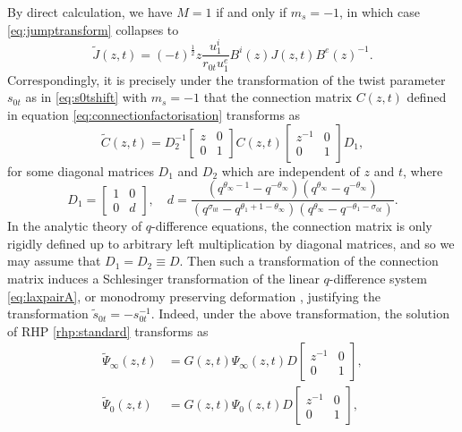\documentclass[a4paper,reqno,11pt]{amsart}
\numberwithin{equation}{section}
\numberwithin{figure}{section}
\theoremstyle{plain}
\theoremstyle{remark}
\newcounter{rhp}
\numberwithin{rhp}{section}
\begin{document}
By direct calculation, we have $M=1$ if and only if $m_s=-1$, in which case \eqref{eq:jumptransform} collapses to
\begin{equation*}
    \widetilde{J}(z,t)=(-t)^{\frac{1}{2}}z \frac{u_1^i} {r_{0t}u_1^e}{}B^i(z) J(z,t)B^e(z)^{-1}.
\end{equation*}
Correspondingly, it is precisely under the transformation of the twist parameter $s_{0t}$ as in \eqref{eq:s0tshift} with $m_s=-1$ that the connection matrix $C(z,t)$ defined in equation \eqref{eq:connectionfactorisation} transforms as
\begin{equation*}
    \widetilde{C}(z,t)= D_2^{-1} \begin{bmatrix}
        z & 0\\
        0 & 1
    \end{bmatrix}C(z,t)\begin{bmatrix}
        z^{-1} & 0\\
        0 & 1
    \end{bmatrix} D_1,
\end{equation*}
for some diagonal matrices $D_{1}$ and $D_2$ which are independent of $z$ and $t$, where
\begin{equation*}
    D_1=\begin{bmatrix}
        1 & 0\\
        0 & d
    \end{bmatrix},\quad d=\frac{\left(q^{\theta _{\infty }-1}-q^{-\theta _{\infty }}\right) \left(q^{\theta _{\infty }}-q^{-\theta _{\infty }}\right)}{\left(q^{\sigma_{0t} }-q^{\theta _1+1-\theta_\infty}\right) \left(q^{\theta _{\infty }}-q^{-\theta _1-\sigma_{0t} }\right)}.
\end{equation*}
In the analytic theory of $q$-difference equations, the connection matrix is only rigidly defined up to arbitrary left multiplication by diagonal matrices, and so we may assume that $D_1=D_2\equiv D$. Then such a transformation of the connection matrix induces a Schlesinger transformation of the linear $q$-difference system \eqref{eq:laxpairA}, or monodromy preserving deformation \cite{ormerod2011}, justifying the transformation $\widetilde{s}_{0t}=-s_{0t}^{-1}$.
Indeed, under the above transformation, the solution of RHP \ref{rhp:standard} transforms as
\begin{align}
\widetilde{\Psi}_\infty(z,t)&=G(z,t)\Psi_\infty(z,t)D\begin{bmatrix}
        z^{-1} & 0\\
        0 & 1
    \end{bmatrix},\\
\widetilde{\Psi}_0(z,t)&=G(z,t)\Psi_0(z,t)D\begin{bmatrix}
        z^{-1} & 0\\
        0 & 1
    \end{bmatrix},
\end{align}
\end{document}
